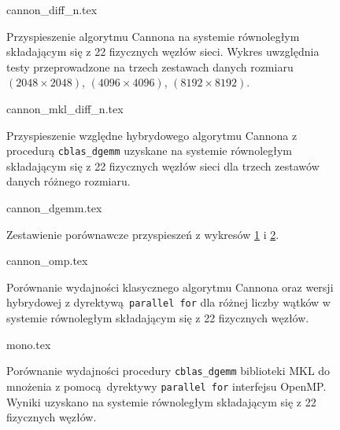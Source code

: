 \begin{figure}[H]
\centering
\footnotesize
{cannon_diff_n.tex}
\caption{Przyspieszenie algorytmu Cannona na systemie równoległym składającym się z 22 fizycznych węzłów sieci. Wykres uwzględnia testy przeprowadzone na trzech zestawach danych rozmiaru \((2048\times 2048)\), \((4096\times 4096)\), \((8192\times 8192)\).}
\label{pl:cannon_seq_diff}
\end{figure}


\begin{figure}[H]
\centering
\footnotesize
{cannon_mkl_diff_n.tex}
\caption{Przyspieszenie względne hybrydowego algorytmu Cannona z procedurą \texttt{cblas\_dgemm} uzyskane na systemie równoległym składającym się z 22 fizycznych węzłów sieci dla trzech zestawów danych różnego rozmiaru.}
\label{pl:cannon_dgemm_diff}
\end{figure}

\begin{figure}[H]
\centering
\footnotesize
{cannon_dgemm.tex}
\caption{Zestawienie porównawcze przyspieszeń z wykresów \ref{pl:cannon_seq_diff} i \ref{pl:cannon_dgemm_diff}.} 
\label{pl:compar_dgemm}
\end{figure}

\begin{figure}[H]
\centering
\footnotesize
{cannon_omp.tex}
\caption{Porównanie wydajności klasycznego algorytmu Cannona oraz wersji hybrydowej z dyrektywą \texttt{parallel for} dla różnej liczby wątków w systemie równoległym składającym się z 22 fizycznych węzłów.}
\label{pl:cannon_omp}
\end{figure}





\begin{figure}[H]
\centering
\footnotesize
{mono.tex}
\caption{Porównanie wydajności procedury \texttt{cblas\_dgemm} biblioteki MKL do mnożenia z pomocą dyrektywy \texttt{parallel for} interfejsu OpenMP. Wyniki uzyskano na systemie równoległym składającym się z 22 fizycznych węzłów.}
\label{pl:mono}
\end{figure}


